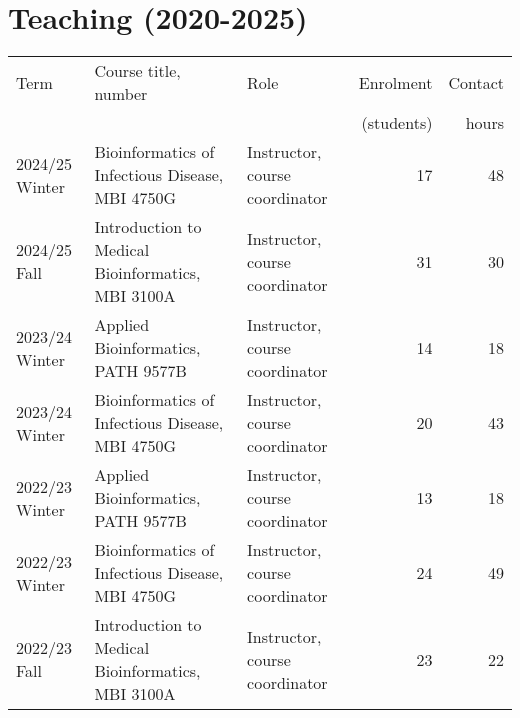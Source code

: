 
\clearpage
\section{Teaching (2020-2025)}



\bgroup
\setlength{\tabcolsep}{6pt}
\def\arraystretch{1.3}%
\begin{tabular}{lp{2.35in}p{1.2in}rr}
Term & Course title, number & Role & Enrolment & Contact\\[-3pt]
  &  &  &  (students) & hours \\
\hline

2024/25 Winter & Bioinformatics of Infectious Disease, MBI 4750G & Instructor, course coordinator & 17 & 48\\

2024/25 Fall & Introduction to Medical Bioinformatics, MBI 3100A & Instructor, course coordinator & 31 & 30\\

2023/24 Winter & Applied Bioinformatics, PATH 9577B & Instructor, course coordinator & 14 & 18\\
2023/24 Winter & Bioinformatics of Infectious Disease, MBI 4750G & Instructor, course coordinator & 20 & 43\\ 

2022/23 Winter & Applied Bioinformatics, PATH 9577B & Instructor, course coordinator & 13 & 18\\
2022/23 Winter & Bioinformatics of Infectious Disease, MBI 4750G & Instructor, course coordinator & 24 & 49\\

2022/23 Fall & Introduction to Medical Bioinformatics, MBI 3100A & Instructor, course coordinator & 23 & 22\\



\end{tabular}
